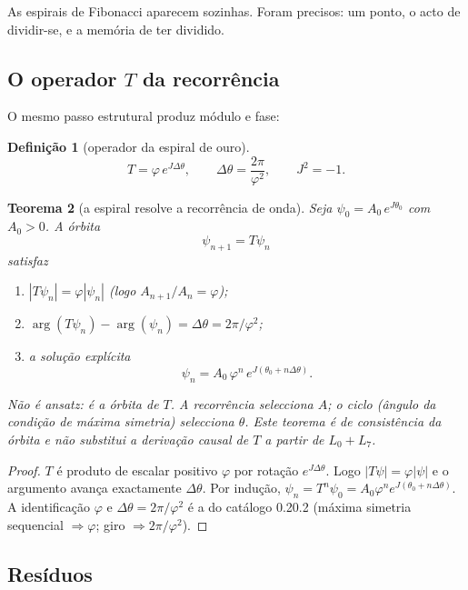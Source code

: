 \documentclass[11pt,a4paper]{article}
\newtheorem{teorema}{Teorema}
\newtheorem{definicao}[teorema]{Definição}
\begin{document}
As espirais de Fibonacci aparecem sozinhas. Foram precisos: um ponto, o acto de dividir-se,
e a memória de ter dividido.

\subsection{O operador $T$ da recorrência}

O mesmo passo estrutural produz módulo e fase:

\begin{definicao}[operador da espiral de ouro]
\label{def:T-espiral}
\[
T=\varphi\,e^{J\Delta\theta},\qquad
\Delta\theta=\frac{2\pi}{\varphi^2},\qquad
J^2=-1.
\]
\end{definicao}

\begin{teorema}[a espiral resolve a recorrência de onda]
\label{thm:espiral-psi}
Seja $\psi_0=A_0\,e^{J\theta_0}$ com $A_0>0$. A órbita
\[
\psi_{n+1}=T\psi_n
\]
satisfaz
\begin{enumerate}[leftmargin=1.2em,itemsep=1pt]
  \item $|T\psi_n|=\varphi|\psi_n|$ \quad (logo $A_{n+1}/A_n=\varphi$);
  \item $\arg(T\psi_n)-\arg(\psi_n)=\Delta\theta=2\pi/\varphi^2$;
  \item a solução explícita
        \[
        \boxed{\psi_n=A_0\,\varphi^n\,e^{J(\theta_0+n\Delta\theta)}}.
        \]
\end{enumerate}
Não é ansatz: é a órbita de $T$. A recorrência selecciona $A$; o ciclo (ângulo da condição
de máxima simetria) selecciona $\theta$. Este teorema é de consistência da órbita e não
substitui a derivação causal de $T$ a partir de $L_0+L_7$.
\end{teorema}

\begin{proof}
$T$ é produto de escalar positivo $\varphi$ por rotação $e^{J\Delta\theta}$. Logo
$|T\psi|=\varphi|\psi|$ e o argumento avança exactamente $\Delta\theta$. Por indução,
$\psi_n=T^n\psi_0=A_0\varphi^n e^{J(\theta_0+n\Delta\theta)}$.
A identificação $\varphi$ e $\Delta\theta=2\pi/\varphi^2$ é a do catálogo 0.20.2
(máxima simetria sequencial $\Rightarrow\varphi$; giro $\Rightarrow 2\pi/\varphi^2$).
\end{proof}

\subsection{Resíduos}
\end{document}
